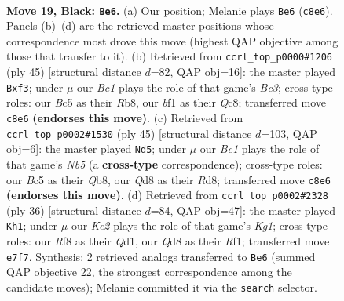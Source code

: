 \documentclass[11pt]{article}
\begin{document}
\clearpage

\begin{figure}[p]\centering
\begin{subfigure}{0.46\textwidth}\centering
\resizebox{\linewidth}{!}{%
\newchessgame
\chessboard[
  setfen={rnbq1r2/pp2k3/6p1/2b1Q1P1/P7/2N2N2/1P3P2/R1B1KB1R b KQ - 0 19},
  showmover=false,
  pgfstyle=straightmove, color=movearrow, markmove={c8-e6}
]}
\caption{}
\end{subfigure}\hfill
\begin{subfigure}{0.46\textwidth}\centering
\resizebox{\linewidth}{!}{%
\newchessgame
\chessboard[
  setfen={1rq2rk1/4R1bp/p1b3p1/8/8/5N2/PP3PPP/R1B1Q1K1 b - - 0 23},
  showmover=false,
  pgfstyle=straightmove, color=movearrow, markmove={c6-f3}
]}
\caption{}
\end{subfigure}
\\[4pt]
\begin{subfigure}{0.46\textwidth}\centering
\resizebox{\linewidth}{!}{%
\newchessgame
\chessboard[
  setfen={1q1r2k1/1b2bp1p/4p3/5p1N/1nB5/4PN2/5PPP/2R2QK1 b - - 7 23},
  showmover=false,
  pgfstyle=straightmove, color=movearrow, markmove={b4-d5}
]}
\caption{}
\end{subfigure}\hfill
\begin{subfigure}{0.46\textwidth}\centering
\resizebox{\linewidth}{!}{%
\newchessgame
\chessboard[
  setfen={b4rk1/5p2/1q1p1bpp/1N2n3/4P3/1N6/1PP1B1PP/3Q1RK1 w - - 1 19},
  showmover=false,
  pgfstyle=straightmove, color=movearrow, markmove={g1-h1}
]}
\caption{}
\end{subfigure}
\caption{\textbf{Move 19, Black: \texttt{Be6}.} (a) Our position; Melanie plays \texttt{Be6} (\texttt{c8e6}). Panels (b)--(d) are the retrieved master positions whose correspondence most drove this move (highest QAP objective among those that transfer to it). (b) Retrieved from \texttt{ccrl\_top\_p0000\#1206} (ply 45) [structural distance $d$=82, QAP obj=16]: the master played \texttt{Bxf3}; under $\mu$ our \emph{Bc1} plays the role of that game's \emph{Bc3}; cross-type roles: our \emph{B}c5 as their \emph{R}b8, our \emph{b}f1 as their \emph{Q}c8; transferred move \texttt{c8e6} \textbf{(endorses this move)}. (c) Retrieved from \texttt{ccrl\_top\_p0002\#1530} (ply 45) [structural distance $d$=103, QAP obj=6]: the master played \texttt{Nd5}; under $\mu$ our \emph{Bc1} plays the role of that game's \emph{Nb5} (a \textbf{cross-type} correspondence); cross-type roles: our \emph{B}c5 as their \emph{Q}b8, our \emph{Q}d8 as their \emph{R}d8; transferred move \texttt{c8e6} \textbf{(endorses this move)}. (d) Retrieved from \texttt{ccrl\_top\_p0002\#2328} (ply 36) [structural distance $d$=84, QAP obj=47]: the master played \texttt{Kh1}; under $\mu$ our \emph{Ke2} plays the role of that game's \emph{Kg1}; cross-type roles: our \emph{R}f8 as their \emph{Q}d1, our \emph{Q}d8 as their \emph{R}f1; transferred move \texttt{e7f7}. Synthesis: 2 retrieved analogs transferred to \texttt{Be6} (summed QAP objective 22, the strongest correspondence among the candidate moves); Melanie committed it via the \texttt{search} selector.}
\label{fig:thought-m37}
\end{figure}
\end{document}
